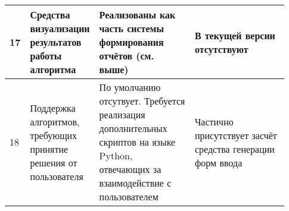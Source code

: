 \begin{landscape}
\begin{longtable}{|p{0.03\linewidth}|p{0.2\linewidth}|p{0.35\linewidth}|p{0.35\linewidth}|}
        17         & Средства визуализации результатов работы алгоритма                                         & Реализованы как часть системы формирования отчётов (см. выше)                                                                                                                                                                                                                                                                                                                                                                                                                                                                                                                                                                                                      & В текущей версии отсутствуют                                                                                                                                                                                                                                                                     \\
        \hline
        18         & Поддержка алгоритмов, требующих принятие решения от пользователя                           & По умолчанию отсутвует. Требуется реализация дополнительных скриптов на языке Python, отвечающих за взаимодействие с пользователем                                                                                                                                                                                                                                                                                                                                                                                                                                                                                                                                 & Частично присутствует засчёт средства генерации форм ввода\cite{SokolovPershin2017}                                                                                                                                                                                                              \\
        \hline

\end{longtable}
\end{landscape}
